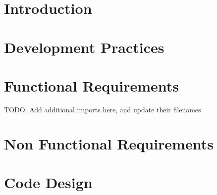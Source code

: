 



\chapter{Introduction}








\chapter{Development Practices}







\chapter{Functional Requirements}


TODO: Add additional imports here, and update their filenames
%
%
%



\newpage



\chapter{Non Functional Requirements}




\chapter{Code Design}







